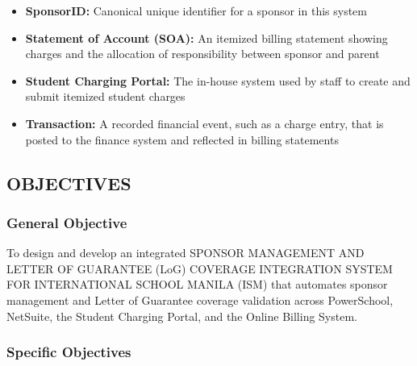 \begin{itemize}
  \item \textbf{SponsorID:} Canonical unique identifier for a sponsor in this system
  \item \textbf{Statement of Account (SOA):} An itemized billing statement showing charges and the allocation of responsibility between sponsor and parent
  \item \textbf{Student Charging Portal:} The in-house system used by staff to create and submit itemized student charges
  \item \textbf{Transaction:} A recorded financial event, such as a charge entry, that is posted to the finance system and reflected in billing statements
\end{itemize}

\subsection{OBJECTIVES}

\subsubsection{General Objective}

    To design and develop an integrated SPONSOR MANAGEMENT AND LETTER OF GUARANTEE (LoG) COVERAGE INTEGRATION SYSTEM FOR INTERNATIONAL SCHOOL MANILA (ISM) that automates sponsor management and Letter of Guarantee coverage validation across PowerSchool, NetSuite, the Student Charging Portal, and the Online Billing System.

\subsubsection{Specific Objectives}

